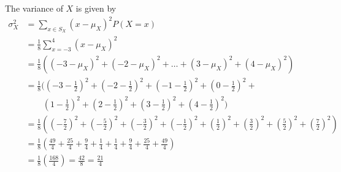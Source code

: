 \documentclass[answers]{exam}
\begin{document}
\begin{questions}
\begin{parts}
\begin{solution}
            The variance of $X$ is given by
            \begin{align*}
                \sigma_X^2 & = \sum_{x \in S_X} (x - \mu_X)^2 P(X = x)                                                                                                                                    \\
                           & = \frac{1}{8} \sum_{x = -3}^4 (x - \mu_X)^2                                                                                                                                  \\
                           & = \frac{1}{8} \left((-3 - \mu_X)^2 + (-2 - \mu_X)^2 + \dots + (3 - \mu_X)^2 + (4 - \mu_X)^2\right)                                                                           \\
                           & = \frac{1}{8} ((-3 - \frac{1}{2})^2 + (-2 - \frac{1}{2})^2 + (-1 - \frac{1}{2})^2 + (0 - \frac{1}{2})^2 +                                                                    \\
                           & \qquad (1 - \frac{1}{2})^2 + (2 - \frac{1}{2})^2 + (3 - \frac{1}{2})^2 + (4 - \frac{1}{2})^2)                                                                                \\
                           & = \frac{1}{8} \left((-\frac{7}{2})^2 + (-\frac{5}{2})^2 + (-\frac{3}{2})^2 + (-\frac{1}{2})^2 + (\frac{1}{2})^2 + (\frac{3}{2})^2 + (\frac{5}{2})^2 + (\frac{7}{2})^2\right) \\
                           & = \frac{1}{8} \left(\frac{49}{4} + \frac{25}{4} + \frac{9}{4} + \frac{1}{4} + \frac{1}{4} + \frac{9}{4} + \frac{25}{4} + \frac{49}{4}\right)                                 \\
                           & = \frac{1}{8} \left(\frac{168}{4}\right) = \frac{42}{8} = \frac{21}{4}                                                                                                       \\
            \end{align*}

        \end{solution}

\end{parts}
\end{questions}
\end{document}
